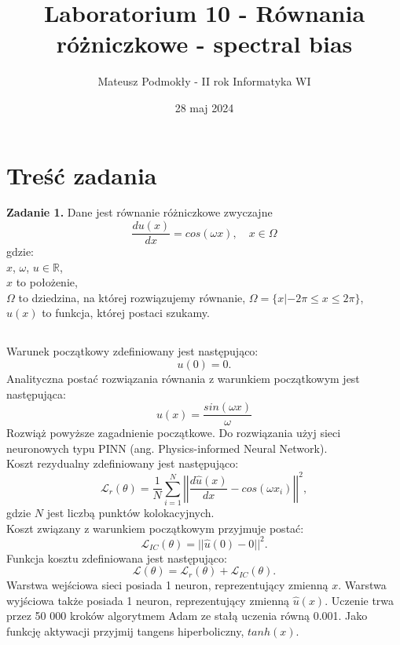 \documentclass[11pt, leqno]{scrartcl}
\title{Laboratorium 10 - Równania różniczkowe - spectral bias}
\author{Mateusz Podmokły - II rok Informatyka WI}
\date{28 maj 2024}
\begin{document}
    \maketitle
    \section{Treść zadania}
    \textbf{Zadanie 1.} Dane jest równanie różniczkowe zwyczajne
    \[
        \frac{du(x)}{dx}=cos(\omega x), \quad x \in \Omega
    \]
    gdzie: \\
    $x$, $\omega$, $u \in \mathbb{R}$, \\
    $x$ to położenie, \\
    $\Omega$ to dziedzina, na której rozwiązujemy równanie,
    $\Omega=\{x|-2\pi \leq x \leq 2\pi\}$, \\
    $u(x)$ to funkcja, której postaci szukamy.

    \subsection*{}
    Warunek początkowy zdefiniowany jest następująco:
    \[
        u(0)=0.
    \]
    Analityczna postać rozwiązania równania z warunkiem
    początkowym jest następująca:
    \[
        u(x)=\frac{sin(\omega x)}{\omega}
    \]
    Rozwiąż powyższe zagadnienie początkowe. Do rozwiązania
    użyj sieci neuronowych typu PINN (ang. Physics-informed Neural
    Network). \\
    Koszt rezydualny zdefiniowany jest następująco:
    \[
        \mathcal{L}_r(\theta)=\frac{1}{N}\sum_{i=1}^{N}
            \left| \left| \frac{d\hat{u}(x)}{dx}-cos(\omega x_i)
            \right| \right| ^2,
    \]
    gdzie $N$ jest liczbą punktów kolokacyjnych. \\
    Koszt związany z warunkiem początkowym przyjmuje postać:
    \[
        \mathcal{L}_{IC}(\theta)=||\hat{u}(0)-0||^2.
    \]
    Funkcja kosztu zdefiniowana jest następująco:
    \[
        \mathcal{L}(\theta)=\mathcal{L}_r(\theta)+
            \mathcal{L}_{IC}(\theta).
    \]
    Warstwa wejściowa sieci posiada 1 neuron, reprezentujący
    zmienną $x$. Warstwa wyjściowa także posiada 1 neuron,
    reprezentujący zmienną $\hat{u}(x)$. Uczenie trwa
    przez 50 000 kroków algorytmem Adam ze stałą uczenia równą
    0.001. Jako funkcję aktywacji przyjmij tangens hiperboliczny,
    $tanh(x)$.
\end{document}
